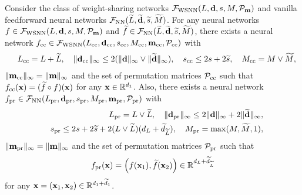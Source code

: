 \documentclass[twoside,11pt]{article}
\def\cF{\mathcal F}
\def\cP{\mathcal P}
\newcommand{\bd}{{\bf d}}
\newcommand{\bfm}{{\bf m}}
\newcommand{\bx}{{\bf x}}
\newcommand{\bbR}{{\mathbb R}}
\newcommand{\bean}{\setlength\arraycolsep{1pt}\begin{eqnarray*}}
\newcommand{\eean}{\end{eqnarray*}}
\begin{document}
\begin{lemma}
\label{secnn:sharing}
Consider the class of weight-sharing networks $\cF_{\rm WSNN}(L,\bd,s,M,\cP_{\bfm})$ and vanilla feedforward neural networks $\cF_{\rm NN}( \widetilde L, \widetilde \bd, \widetilde s, \widetilde M)$.
For any neural networks $f \in \cF_{\rm WSNN}(L,\bd,s,M,\cP_{\bfm})$ and $\widetilde f \in \cF_{\rm NN}( \widetilde L, \widetilde \bd, \widetilde s, \widetilde M)$, there exists a neural network $f_{\rm cc} \in \cF_{\rm WSNN}( L_{\rm cc} , \bd_{\rm cc} , s_{\rm cc} , M_{\rm cc}, \bfm_{\rm cc}, \cP_{\rm cc})$ with
\bean
&& L_{\rm cc} = L + \widetilde L, \quad \|\bd_{\rm cc}\|_{\infty} \leq 2 (\|\bd\|_{\infty} \vee \| \widetilde \bd \|_{\infty}), \quad s_{\rm cc} \leq 2s + 2\widetilde s, \quad M_{\rm cc} = M \vee \widetilde M,
\eean
$\| \bfm_{\rm cc} \|_{\infty} = \| \bfm \|_{\infty}$ and the set of permutation matrices $\cP_{\rm cc}$ such that $f_{\rm cc}(\bx) = (\widetilde f \circ f)(\bx)$ for any $\bx \in \bbR^{d_1}$.
Also, there exists a neural network $f_{\rm pr} \in \cF_{\rm NN}( L_{\rm pr} , \bd_{\rm pr} , s_{\rm pr} , M_{\rm pr}, \bfm_{\rm pr}, \cP_{\rm pr})$ with
\bean
&& L_{\rm pr} = L \vee \widetilde L, \quad \|\bd_{\rm pr}\|_{\infty} \leq 2 \|\bd\|_{\infty} + 2 \| \widetilde \bd \|_{\infty},
\\
&& s_{\rm pr} \leq 2s + 2\widetilde s + 2(L \vee \widetilde L)(d_{L} + \widetilde d_{\widetilde L}), \quad M_{\rm pr} = \max(M, \widetilde M, 1),
\eean
$\| \bfm_{\rm pr} \|_{\infty} = \| \bfm \|_{\infty}$ and the set of permutation matrices $\cP_{\rm pr}$ such that
\bean
f_{\rm pr} (\bx) = \left( f(\bx_1), \widetilde f(\bx_2) \right) \in \bbR^{d_{L} + \widetilde d_{\widetilde L}}
\eean
for any $\bx =  (\bx_1,\bx_2) \in \bbR^{d_1 + \widetilde d_{1}}$.

\end{lemma}
\end{document}
